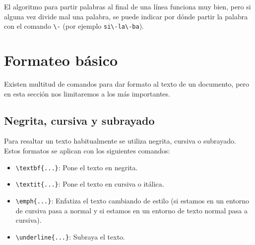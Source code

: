 \documentclass[
  letterpaper,
  DIV=11,
  numbers=noendperiod]{scrreport}
\providecommand{\tightlist}{%
  \setlength{\itemsep}{0pt}\setlength{\parskip}{0pt}}\usepackage{longtable,booktabs,array}
\begin{document}
\begin{tcolorbox}[enhanced jigsaw, arc=.35mm, toprule=.15mm, opacitybacktitle=0.6, colback=white, coltitle=black, colbacktitle=quarto-callout-warning-color!10!white, breakable, colframe=quarto-callout-warning-color-frame, left=2mm, opacityback=0, bottomtitle=1mm, toptitle=1mm, titlerule=0mm, title=\textcolor{quarto-callout-warning-color}{\faExclamationTriangle}\hspace{0.5em}{Advertencia}, bottomrule=.15mm, leftrule=.75mm, rightrule=.15mm]
El algoritmo para partir palabras al final de una línea funciona muy
bien, pero si alguna vez divide mal una palabra, se puede indicar por
dónde partir la palabra con el comando \texttt{\textbackslash{}-} (por
ejemplo \texttt{si\textbackslash{}-la\textbackslash{}-ba}).
\end{tcolorbox}


\hypertarget{formateo-buxe1sico}{%
\chapter{Formateo básico}\label{formateo-buxe1sico}}

Existen multitud de comandos para dar formato al texto de un documento,
pero en esta sección nos limitaremos a los más importantes.

\hypertarget{negrita-cursiva-y-subrayado}{%
\section{Negrita, cursiva y
subrayado}\label{negrita-cursiva-y-subrayado}}

Para resaltar un texto habitualmente se utiliza negrita, cursiva o
subrayado. Estos formatos se aplican con los siguientes comandos:

\begin{itemize}
\tightlist
\item
  \texttt{\textbackslash{}textbf\{...\}}: Pone el texto en negrita.
\item
  \texttt{\textbackslash{}textit\{...\}}: Pone el texto en cursiva o
  itálica.
\item
  \texttt{\textbackslash{}emph\{...\}}: Enfatiza el texto cambiando de
  estilo (si estamos en un entorno de cursiva pasa a normal y si estamos
  en un entorno de texto normal pasa a cursiva).
\item
  \texttt{\textbackslash{}underline\{...\}}: Subraya el texto.
\end{itemize}
\end{document}
